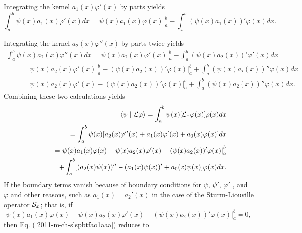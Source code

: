 Integrating the  kernel $a_1(x) \varphi'(x)$ by parts yields
\begin{equation}
\int_a^b
\psi (x)
  a_1(x) \varphi'(x)
dx
=
\left.
\psi (x)
  a_1(x) \varphi(x)
\right|_a^b -  \int_a^b
(\psi (x)
  a_1(x) )'\varphi(x)
dx
.
\end{equation}

Integrating the  kernel $a_2(x) \varphi''(x)$ by parts twice yields
\begin{equation}
\begin{split}
\int_a^b
\psi (x)
  a_2(x) \varphi''(x)
dx
=
\left.
\psi (x)
  a_2(x) \varphi'(x)
\right|_a^b -  \int_a^b
(\psi (x)
  a_2(x) )'\varphi'(x)
dx
\\
\qquad =
\left.
\psi (x)
  a_2(x) \varphi'(x)
\right|_a^b -
\left.
(\psi (x)
  a_2(x))' \varphi(x)
\right|_a^b
+
  \int_a^b
(\psi (x)
  a_2(x) )''\varphi(x)
dx    \\
\qquad =
\left.
\psi (x)
  a_2(x) \varphi'(x)
 -
(\psi (x)
  a_2(x))' \varphi(x)
\right|_a^b
+
  \int_a^b
(\psi (x)
  a_2(x) )''\varphi(x)
dx
.
\end{split}
\end{equation}
Combining these two calculations yields
\begin{equation}
\begin{split}
\langle \psi \mid {\cal L} \varphi \rangle
=
\int_a^b
\psi (x) [{\cal L}_x\varphi (x)]
\rho  (x)         dx   \\
\qquad =
\int_a^b
\psi (x)
[a_2(x) \varphi''(x) + a_1(x) \varphi'(x) + a_0(x) \varphi (x)]
dx      \\
\qquad =
\left.
\psi (x)
  a_1(x) \varphi(x)
+
\psi (x)
  a_2(x) \varphi'(x)
 -
(\psi (x)
  a_2(x))' \varphi(x)
\right|_a^b   \\
\qquad
\qquad
+
  \int_a^b
[( a_2(x)\psi (x) )'' - ( a_1(x)\psi (x)  )'    + a_0(x) \psi (x)] \varphi(x)
dx
.
\end{split}
\label{2011-m-ch-slspbtfao1aaa}
\end{equation}
If the boundary terms vanish because of boundary conditions for $\psi $,  $\psi'$, $\varphi'$ , and $\varphi$ and other reasons,
such as $a_1(x)=a_2'(x)$ in the case of the Sturm-Liouville
operator ${\cal S}_x$; that is, if
\begin{equation}
\left.
\psi (x)
  a_1(x) \varphi(x)
+
\psi (x)
  a_2(x) \varphi'(x)
 -
(\psi (x)
  a_2(x))' \varphi(x)
\right|_a^b
=0,
\label{2016-m-ch-sl-bc}
\end{equation}
then Eq. (\ref{2011-m-ch-slspbtfao1aaa}) reduces to
